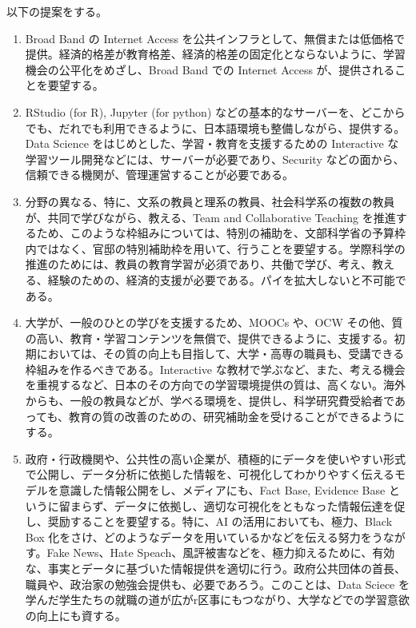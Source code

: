 \documentclass[
]{book}
\theoremstyle{definition}
\theoremstyle{definition}
\theoremstyle{definition}
\theoremstyle{definition}
\theoremstyle{remark}
\begin{document}
以下の提案をする。

\begin{enumerate}
\def\labelenumi{\arabic{enumi}.}
\item
  Broad Band の Internet Access を公共インフラとして、無償または低価格で提供。経済的格差が教育格差、経済的格差の固定化とならないように、学習機会の公平化をめざし、Broad Band での Internet Access が、提供されることを要望する。
\item
  RStudio (for R), Jupyter (for python) などの基本的なサーバーを、どこからでも、だれでも利用できるように、日本語環境も整備しながら、提供する。Data Science をはじめとした、学習・教育を支援するための Interactive な学習ツール開発などには、サーバーが必要であり、Security などの面から、信頼できる機関が、管理運営することが必要である。
\item
  分野の異なる、特に、文系の教員と理系の教員、社会科学系の複数の教員が、共同で学びながら、教える、Team and Collaborative Teaching を推進するため、このような枠組みについては、特別の補助を、文部科学省の予算枠内ではなく、官邸の特別補助枠を用いて、行うことを要望する。学際科学の推進のためには、教員の教育学習が必須であり、共働で学び、考え、教える、経験のための、経済的支援が必要である。パイを拡大しないと不可能である。
\item
  大学が、一般のひとの学びを支援するため、MOOCs や、OCW その他、質の高い、教育・学習コンテンツを無償で、提供できるように、支援する。初期においては、その質の向上も目指して、大学・高専の職員も、受講できる枠組みを作るべきである。Interactive な教材で学ぶなど、また、考える機会を重視するなど、日本のその方向での学習環境提供の質は、高くない。海外からも、一般の教員などが、学べる環境を、提供し、科学研究費受給者であっても、教育の質の改善のための、研究補助金を受けることができるようにする。
\item
  政府・行政機関や、公共性の高い企業が、積極的にデータを使いやすい形式で公開し、データ分析に依拠した情報を、可視化してわかりやすく伝えるモデルを意識した情報公開をし、メディアにも、Fact Base, Evidence Base というに留まらず、データに依拠し、適切な可視化をともなった情報伝達を促し、奨励することを要望する。特に、AI の活用においても、極力、Black Box 化をさけ、どのようなデータを用いているかなどを伝える努力をうながす。Fake News、Hate Speach、風評被害などを、極力抑えるために、有効な、事実とデータに基づいた情報提供を適切に行う。政府公共団体の首長、職員や、政治家の勉強会提供も、必要であろう。このことは、Data Sciece を学んだ学生たちの就職の道が広がr区事にもつながり、大学などでの学習意欲の向上にも資する。
\end{enumerate}
\end{document}
